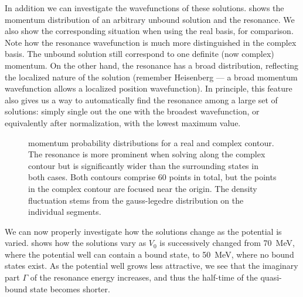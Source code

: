 \documentclass[../main/report.tex]{subfiles}
\begin{document}
In addition we can investigate the wavefunctions of these solutions. 
 shows the momentum distribution of an arbitrary unbound solution and the resonance. We also show the corresponding situation when using the real basis, for comparison. Note how the resonance wavefunction is much more distinguished in the complex basis.  
The unbound solution still correspond to one definite (now complex) momentum. 
On the other hand, the resonance has a broad distribution, reflecting the localized nature of the solution 
(remember Heisenberg --- a broad momentum wavefunction allows a localized position wavefunction). 
In principle, this feature also gives us a way to automatically find the resonance among a large set of solutions: 
simply single out the one with the broadest wavefunction, or equivalently after normalization, with the lowest maximum value.


\begin{figure}[H]
\caption{ momentum probability distributions for a real and complex contour. The resonance is more prominent when solving along the complex contour but is significantly wider than the surrounding states in both cases. Both contours comprise 60 points in total, but the points in the complex contour are focused near the origin. The density fluctuation stems from the gauss-legedre distribution on the individual segments.} 
\label{fig:complex_mom_wavefunctions}
\end{figure}




We can now properly investigate how the solutions change as the potential is varied.  shows how the solutions vary as $V_0$ 
is successively changed from \SI{70}{MeV}, where the potential well can contain a bound state, to \SI{50}{MeV}, where no bound states exist. 
As the potential well grows less attractive, we see that the imaginary part $\Gamma$ of the resonance energy increases, and thus the half-time of the quasi-bound state becomes shorter. 
\end{document}

